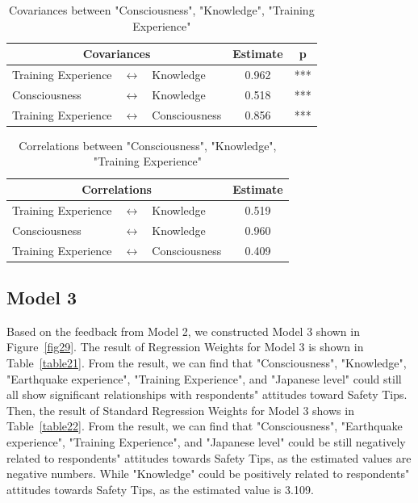 \begin{table}[h]
  \caption{Covariances between "Consciousness", "Knowledge", "Training Experience"}
  \label{table13}
  \centering
  \begin{tabular}{|l|c|l|c|c|}
  \hline
   \multicolumn{3}{|c|}{Covariances} & Estimate & p \\
  \hline
  Training Experience & $\longleftrightarrow$ & Knowledge & 0.962 & *** \\
  Consciousness & $\longleftrightarrow$ & Knowledge & 0.518 & *** \\
  Training Experience & $\longleftrightarrow$ & Consciousness & 0.856 & *** \\
  \hline
  \end{tabular}
\end{table}

\begin{table}[h]
  \caption{Correlations between "Consciousness", "Knowledge", "Training Experience" }
  \label{table14}
  \centering  \begin{tabular}{|l|c|l|c|}
  \hline
   \multicolumn{3}{|c|}{Correlations} & Estimate \\
  \hline
  Training Experience & $\longleftrightarrow$ & Knowledge & 0.519 \\
  Consciousness & $\longleftrightarrow$ & Knowledge & 0.960 \\
  Training Experience & $\longleftrightarrow$ & Consciousness & 0.409 \\
  \hline
  \end{tabular}
\end{table}

\subsection{Model 3}
Based on the feedback from Model 2, we constructed Model 3 shown in Figure~\ref{fig29}. The result of Regression Weights for Model 3 is shown in Table~\ref{table21}. From the result, we can find that "Consciousness", "Knowledge", "Earthquake experience", "Training Experience", and "Japanese level" could still all show significant relationships with respondents" attitudes toward Safety Tips. Then, the result of Standard Regression Weights for Model 3 shows in Table~\ref{table22}. From the result, we can find that "Consciousness", "Earthquake experience", "Training Experience", and "Japanese level" could be still negatively related to respondents" attitudes towards Safety Tips, as the estimated values are negative numbers. While "Knowledge" could be positively related to respondents" attitudes towards Safety Tips, as the estimated value is 3.109. 

